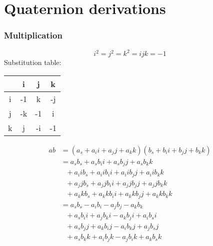 \documentclass{article}
\begin{document}
\section{Quaternion derivations}
\subsubsection{Multiplication}
$$ i^2 = j^2 = k^2 = ijk = -1 $$
Substitution table:
\begin{tabular}{ |c|c|c|c| }
    \hline
      & i  & j  & k \\
    \hline
    i & -1 & k  & -j \\
    \hline
    j & -k & -1 & i \\
    \hline
    k & j  & -i & -1 \\
    \hline
\end{tabular}
\begin{equation}
\begin{split}
ab & = (a_{s} + a_{i}i + a_{j}j + a_{k}k)(b_{s} + b_{i}i + b_{j}j + b_{k}k) \\
    & = a_{s}b_{s} + a_{s}b_{i}i + a_{s}b_{j}j + a_{s}b_{k}k \\
    & \ \ \ + a_{i}ib_{s} + a_{i}ib_{i}i + a_{i}ib_{j}j + a_{i}ib_{k}k \\
    & \ \ \ + a_{j}jb_{s} + a_{j}jb_{i}i + a_{j}jb_{j}j + a_{j}jb_{k}k \\
    & \ \ \ + a_{k}kb_{s} + a_{k}kb_{i}i + a_{k}kb_{j}j + a_{k}kb_{k}k \\
    & = a_{s}b_{s} - a_{i}b_{i} - a_{j}b_{j} - a_{k}b_{k} \\
    & \ \ \ + a_{s}b_{i}i + a_{j}b_{k}i - a_{k}b_{j}i + a_{i}b_{s}i \\
    & \ \ \ + a_{s}b_{j}j + a_{k}b_{i}j - a_{i}b_{k}j + a_{j}b_{s}j \\
    & \ \ \ + a_{s}b_{k}k + a_{i}b_{j}k - a_{j}b_{i}k + a_{k}b_{s}k
\end{split}
\end{equation}
\end{document}
